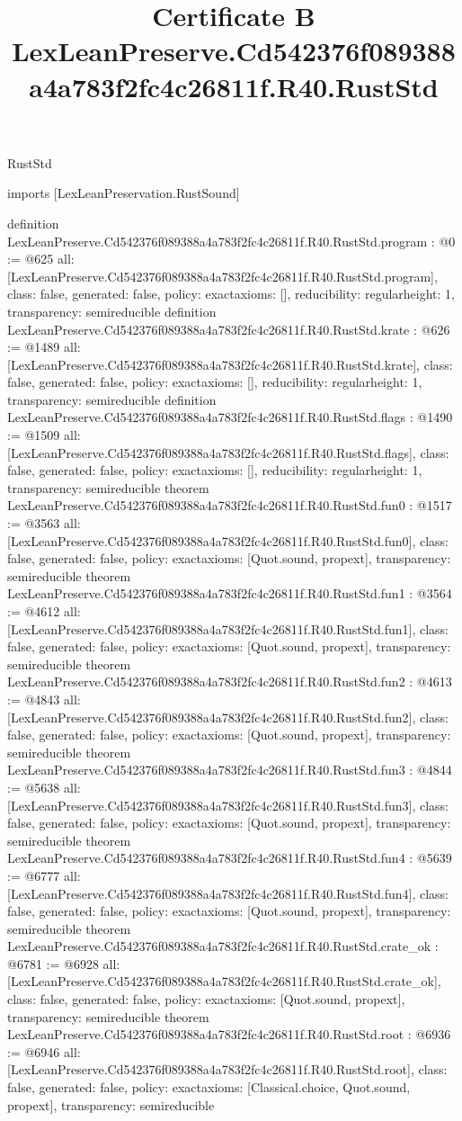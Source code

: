 \begin{lexlean}{RustStd}
\title{Certificate B LexLeanPreserve.Cd542376f089388a4a783f2fc4c26811f.R40.RustStd}
\begin{coremodule}
imports [LexLeanPreservation.RustSound]

definition LexLeanPreserve.Cd542376f089388a4a783f2fc4c26811f.R40.RustStd.program : @0 := @625 {
  all: [LexLeanPreserve.Cd542376f089388a4a783f2fc4c26811f.R40.RustStd.program],
  class: false,
  generated: false,
  policy: exact{axioms: []},
  reducibility: regular{height: 1},
  transparency: semireducible
}
definition LexLeanPreserve.Cd542376f089388a4a783f2fc4c26811f.R40.RustStd.krate : @626 := @1489 {
  all: [LexLeanPreserve.Cd542376f089388a4a783f2fc4c26811f.R40.RustStd.krate],
  class: false,
  generated: false,
  policy: exact{axioms: []},
  reducibility: regular{height: 1},
  transparency: semireducible
}
definition LexLeanPreserve.Cd542376f089388a4a783f2fc4c26811f.R40.RustStd.flags : @1490 := @1509 {
  all: [LexLeanPreserve.Cd542376f089388a4a783f2fc4c26811f.R40.RustStd.flags],
  class: false,
  generated: false,
  policy: exact{axioms: []},
  reducibility: regular{height: 1},
  transparency: semireducible
}
theorem LexLeanPreserve.Cd542376f089388a4a783f2fc4c26811f.R40.RustStd.fun0 : @1517 := @3563 {
  all: [LexLeanPreserve.Cd542376f089388a4a783f2fc4c26811f.R40.RustStd.fun0],
  class: false,
  generated: false,
  policy: exact{axioms: [Quot.sound, propext]},
  transparency: semireducible
}
theorem LexLeanPreserve.Cd542376f089388a4a783f2fc4c26811f.R40.RustStd.fun1 : @3564 := @4612 {
  all: [LexLeanPreserve.Cd542376f089388a4a783f2fc4c26811f.R40.RustStd.fun1],
  class: false,
  generated: false,
  policy: exact{axioms: [Quot.sound, propext]},
  transparency: semireducible
}
theorem LexLeanPreserve.Cd542376f089388a4a783f2fc4c26811f.R40.RustStd.fun2 : @4613 := @4843 {
  all: [LexLeanPreserve.Cd542376f089388a4a783f2fc4c26811f.R40.RustStd.fun2],
  class: false,
  generated: false,
  policy: exact{axioms: [Quot.sound, propext]},
  transparency: semireducible
}
theorem LexLeanPreserve.Cd542376f089388a4a783f2fc4c26811f.R40.RustStd.fun3 : @4844 := @5638 {
  all: [LexLeanPreserve.Cd542376f089388a4a783f2fc4c26811f.R40.RustStd.fun3],
  class: false,
  generated: false,
  policy: exact{axioms: [Quot.sound, propext]},
  transparency: semireducible
}
theorem LexLeanPreserve.Cd542376f089388a4a783f2fc4c26811f.R40.RustStd.fun4 : @5639 := @6777 {
  all: [LexLeanPreserve.Cd542376f089388a4a783f2fc4c26811f.R40.RustStd.fun4],
  class: false,
  generated: false,
  policy: exact{axioms: [Quot.sound, propext]},
  transparency: semireducible
}
theorem LexLeanPreserve.Cd542376f089388a4a783f2fc4c26811f.R40.RustStd.crate_ok : @6781 := @6928 {
  all: [LexLeanPreserve.Cd542376f089388a4a783f2fc4c26811f.R40.RustStd.crate_ok],
  class: false,
  generated: false,
  policy: exact{axioms: [Quot.sound, propext]},
  transparency: semireducible
}
theorem LexLeanPreserve.Cd542376f089388a4a783f2fc4c26811f.R40.RustStd.root : @6936 := @6946 {
  all: [LexLeanPreserve.Cd542376f089388a4a783f2fc4c26811f.R40.RustStd.root],
  class: false,
  generated: false,
  policy: exact{axioms: [Classical.choice, Quot.sound, propext]},
  transparency: semireducible
}


\end{coremodule}
\end{lexlean}
